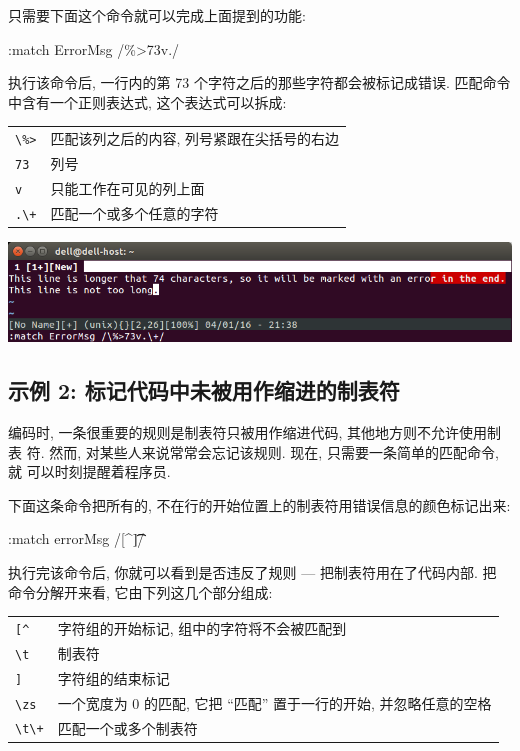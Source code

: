 只需要下面这个命令就可以完成上面提到的功能:
\begin{vimcmd}
:match ErrorMsg /\%>73v.\+/
\end{vimcmd}
执行该命令后, 一行内的第 73 个字符之后的那些字符都会被标记成错误. 匹配命令 
中含有一个正则表达式, 这个表达式可以拆成:
\begin{center}
\begin{tabular}{ll}
    \hline
    \verb'\%>'  & 匹配该列之后的内容, 列号紧跟在尖括号的右边 \\
    \verb'73'   & 列号  \\
    \verb'v'    & 只能工作在可见的列上面 \\
    \verb'.\+'  & 匹配一个或多个任意的字符 \\
    \hline
\end{tabular}
\end{center}
\begin{center}
    \includegraphics[scale=0.6]{./images/page24.png}
\end{center}
\subsection{示例 2: 标记代码中未被用作缩进的制表符}
\label{subsec:mark_tabs_not_used_for_indentation_in_code}
编码时, 一条很重要的规则是制表符只被用作缩进代码, 其他地方则不允许使用制表
符. 然而, 对某些人来说常常会忘记该规则. 现在, 只需要一条简单的匹配命令, 就
可以时刻提醒着程序员.

下面这条命令把所有的, 不在行的开始位置上的制表符用错误信息的颜色标记出来:
\begin{vimcmd}
:match errorMsg /[^\t]\zs\t\+/
\end{vimcmd}
执行完该命令后, 你就可以看到是否违反了规则 --- 把制表符用在了代码内部. 把
命令分解开来看, 它由下列这几个部分组成:
\begin{center}
    \begin{tabular}{ll}
        \hline
        \verb'[^'   & 字符组的开始标记, 组中的字符将不会被匹配到 \\
        \verb'\t'   & 制表符 \\
        \verb']'    & 字符组的结束标记 \\
        \verb'\zs'  & 一个宽度为 0 的匹配, 它把 ``匹配'' 置于一行的开始,
        并忽略任意的空格 \\
        \verb'\t\+' & 匹配一个或多个制表符 \\
        \hline
    \end{tabular}
\end{center}

